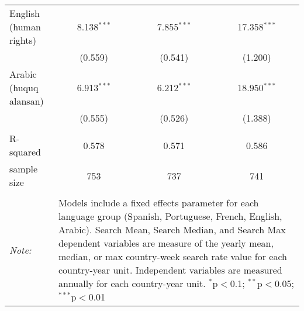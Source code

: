 \begin{table}[!htbp]
\begin{tabular}{@{\extracolsep{5pt}}lccc}
  English (human rights) & 8.138$^{***}$ & 7.855$^{***}$ & 17.358$^{***}$ \\ 
  & (0.559) & (0.541) & (1.200) \\ 
  Arabic (huquq alansan) & 6.913$^{***}$ & 6.212$^{***}$ & 18.950$^{***}$ \\ 
  & (0.555) & (0.526) & (1.388) \\ 
 \hline \\[-1.8ex] 
R-squared  & 0.578 & 0.571 & 0.586 \\ 
sample size  & 753 & 737 & 741 \\ 
\hline 
\hline \\[-1.8ex] 
\textit{Note:}  & \multicolumn{3}{l}{\parbox[t]{8cm}{Models include a fixed effects parameter for each language group (Spanish, Portuguese, French, English, Arabic). Search Mean, Search Median, and Search Max dependent variables are measure of the yearly mean, median, or max country-week search rate value for each country-year unit. Independent variables are measured annually for each country-year unit. $^{*}$p$<$0.1; $^{**}$p$<$0.05; $^{***}$p$<$0.01}} \\ 
\end{tabular} 
\end{table} 
